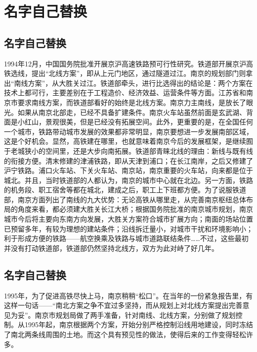 \documentclass[bachelor]{njupthesis}
\begin{document}
\section{名字自己替换}
\subsection{名字自己替换}
1994年12月，中国国务院批准开展京沪高速铁路预可行性研究。铁道部开展京沪高铁选线，提出“北线方案”，即从上元门地区，通过隧道过江。南京的规划部门则拿出“南线方案”，从大胜关过江。铁道部牵头，进行比选得出的结论是：两个方案在技术上都可行，主要差别在于工程造价、经济效益、运营条件等方面。江苏省和南京市要求南线方案，而铁道部看好的始终是北线方案。南京力主南线，是放长了眼光。如果从南京北部走，已经不具备扩建条件。南京火车站虽然前面是玄武湖、背面是小红山，景观很美，但是已经没有拓展空间。此外，更重要的是，在全国任何一个城市，铁路带动城市发展的效果都非常明显，南京要想进一步发展南部区域，这是个好机会。显然，高铁建在哪里，也就意味着南京今后的发展框架，是继续囿于老城狭小的空间里，还是大步向南拓展。铁道部青睐北线的理由：新线与既有线的衔接方便。清末修建的津浦铁路，即从天津到浦口；在长江南岸，之后又修建了沪宁铁路。浦口火车站、下关火车站、南京站，南京重要的火车站，向来都是位于城北。并且，当时铁道部的人都认为，南京的城市中心就在北边。另一方面，铁路的机务段、职工宿舍等都在城北，建成之后，职工上下班都方便。为了说服铁道部，南京方面列出了南线的九大优势：无论高铁从哪里走，从完善南京枢纽总体布局的角度来看，都必须建大胜关长江大桥；根据国务院批准的南京城市规划，南京城市今后将主要向东南方向发展，大胜关方案符合城市扩展方向；南面的场站位置已预留多年，有较为理想的建站条件；沿线拆迁量小，对城市干扰和环境影响小；利于形成方便的铁路——航空换乘及铁路与城市道路联结条件……不过，这些最初并没有打动铁道部，铁道部仍然坚持北线方，双方为此对峙了好几年。


\subsection{名字自己替换}
1995年，为了促进高铁尽快上马，南京稍稍“松口”。在当年的一份紧急报告里，有这样一句话——“南北方案之争不宜过多坚持，而从规划上对北线方案提出完善意见为妥”。南京市规划局做了两手准备，针对南线、北线方案，分别做了规划控制。从1995年起，南京根据两个方案，开始分别严格控制沿线用地建设，同时冻结了南北两条线周围的土地。而这个具有预见性的做法，使得后来的工作变得轻松许多。
\end{document}
